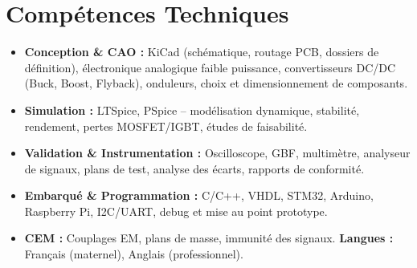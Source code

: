 \documentclass[a4paper,11pt]{article}
\begin{document}
\vspace{1pt}

\section{Compétences Techniques}
\begin{itemize}[leftmargin=*, nosep]
    \item \small{\textbf{Conception \& CAO :} KiCad (schématique, routage PCB, dossiers de définition), électronique analogique faible puissance, convertisseurs DC/DC (Buck, Boost, Flyback), onduleurs, choix et dimensionnement de composants.}
    \item \small{\textbf{Simulation :} LTSpice, PSpice -- modélisation dynamique, stabilité, rendement, pertes MOSFET/IGBT, études de faisabilité.}
    \item \small{\textbf{Validation \& Instrumentation :} Oscilloscope, GBF, multimètre, analyseur de signaux, plans de test, analyse des écarts, rapports de conformité.}
    \item \small{\textbf{Embarqué \& Programmation :} C/C++, VHDL, STM32, Arduino, Raspberry Pi, I2C/UART, debug et mise au point prototype.}
    \item \small{\textbf{CEM :} Couplages EM, plans de masse, immunité des signaux. \quad \textbf{Langues :} Français (maternel), Anglais (professionnel).}
\end{itemize}

\vspace{1pt}

\end{document}
